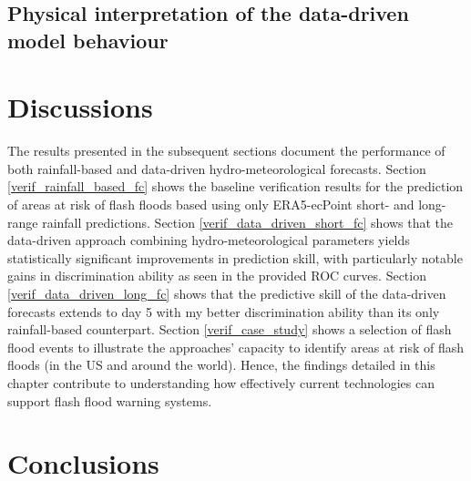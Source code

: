 \subsection{Physical interpretation of the data-driven model behaviour}



\section{Discussions}
\label{data_driven_flash_floods_short_medium_range_discussions}

The results presented in the subsequent sections document the performance of both rainfall-based and data-driven hydro-meteorological forecasts. Section \ref{verif_rainfall_based_fc} shows the baseline verification results for the prediction of areas at risk of flash floods based using only ERA5-ecPoint short- and long-range rainfall predictions. Section \ref{verif_data_driven_short_fc} shows that the data-driven approach combining hydro-meteorological parameters yields statistically significant improvements in prediction skill, with particularly notable gains in discrimination ability as seen in the provided ROC curves. Section \ref{verif_data_driven_long_fc} shows that the predictive skill of the data-driven forecasts extends to day 5 with my better discrimination ability than its only rainfall-based counterpart. Section \ref{verif_case_study} shows a selection of flash flood events to illustrate the approaches' capacity to identify areas at risk of flash floods (in the US and around the world). Hence, the findings detailed in this chapter contribute to understanding how effectively current technologies can support flash flood warning systems.



\section{Conclusions}
\label{data_driven_flash_floods_short_medium_range_conclusions}

